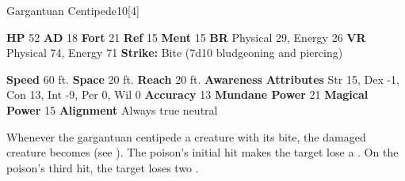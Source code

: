  \begin{monsubsection}{Gargantuan Centipede}{10}[4]
    \vspace{-1em}\vspace{-1em}
    \vspace{0em}

    
    

    \begin{spellcontent}
      \begin{spelltargetinginfo}
        \pari \textbf{HP} 52 \monsep
          \textbf{AD} 18 \monsep
          \textbf{Fort} 21 \monsep
          \textbf{Ref} 15 \monsep
          \textbf{Ment} 15
        \pari \textbf{BR} Physical 29, Energy 26 \monsep
        \textbf{VR} Physical 74, Energy 71
        \pari \textbf{Strike:}
            Bite  (7d10 bludgeoning and piercing)
      \end{spelltargetinginfo}
    \end{spellcontent}
    \begin{monsterfooter}
      \pari \textbf{Speed} 60 ft. \monsep
        \textbf{Space} 20 ft. \monsep
        \textbf{Reach} 20 ft.
      \pari \textbf{Awareness} 
      \pari \textbf{Attributes}
        Str 15, Dex -1,
        Con 13, Int -9,
        Per 0, Wil 0
      \pari \textbf{Accuracy} 13 \monsep
        \textbf{Mundane Power} 21 \monsep
      \textbf{Magical Power} 15
      \pari \textbf{Alignment} Always true neutral
    \end{monsterfooter}
  \end{monsubsection}
        Whenever the gargantuan centipede  a creature with its bite,
          the damaged creature becomes  (see ).
        The poison's initial hit makes the target lose a .
        On the poison's third hit, the target loses two .
  


